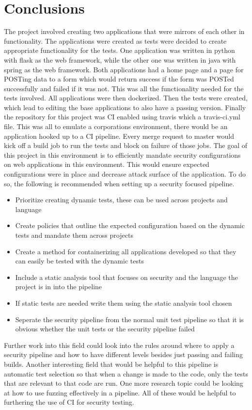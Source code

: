 \section{Conclusions}
The project involved creating two applications that were mirrors of each other in functionality. The applications were created as tests were decided to create appropriate functionality for the tests.
One application was written in python with flask as the web framework, while the other one was written in java with spring as the web framework. Both applications had a home page and a page for
POSTing data to a form which would return success if the form was POSTed successfully and failed if it was not. This was all the functionality needed for the tests involved.
All applications were then dockerized. Then the tests were created, which lead to editing the base applications to also have a passing version. Finally the repository for this project was CI enabled
using travis which a travis-ci.yml file.
This was all to emulate a corporations environment, there would be an application hooked up to a CI pipeline. Every merge request to master would kick off a build job to run the tests and block on
failure of those jobs. The goal of this project in this environment is to efficiently mandate security configurations on web applications in this environment. This would ensure expected configurations
were in place and decrease attack surface of the application. To do so, the following is recommended when setting up a security focused pipeline.
\begin{itemize}
    \item Prioritize creating dynamic tests, these can be used across projects and language
    \item Create policies that outline the expected configuration based on the dynamic tests and mandate them across projects
    \item Create a method for containerizing all applications developed so that they can easily be tested with the dynamic tests
    \item Include a static analysis tool that focuses on security and the language the project is in into the pipeline
    \item If static tests are needed write them using the static analysis tool chosen
    \item Seperate the security pipeline from the normal unit test pipeline so that it is obvious whether the unit tests or the security pipeline failed 
\end{itemize}
Further work into this field could look into the rules around where to apply a security pipeline and how to have different levels besides just passing and failing builds. Another interesting field that
would be helpful to this pipeline is automatic test selection so that when a change is made to the code, only the tests that are relevant to that code are run. One more research topic could be looking
at how to use fuzzing effectively in a pipeline. All of these would be helpful to furthering the use of CI for security testing.
